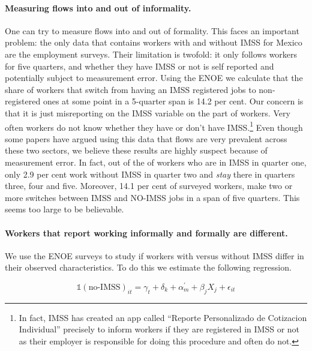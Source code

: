 \documentclass[oneside,11pt]{article}
\begin{document}
\paragraph{Measuring flows into and out of informality.} One can try to measure flows into and out of formality. This faces an important problem: the only data that contains workers with and without IMSS for Mexico are the employment surveys. Their limitation is twofold: it only follows workers for five quarters, and whether they have IMSS or not is self reported and potentially subject to measurement error. Using the ENOE we calculate that the share of workers that switch from having an IMSS registered jobs to non-registered ones at some point in a 5-quarter span is 14.2 per cent.  Our concern is that it is just misreporting on the IMSS variable on the part of workers. Very often workers do not know whether they have or don't have IMSS.\footnote{In fact, IMSS has created an app called ``Reporte Personalizado de Cotizacion Individual'' precisely to inform workers if they are registered in IMSS or not as their employer is responsible for doing this procedure and often do not.} Even though some papers have argued using this data that flows are very prevalent across these two sectors, we believe these results are highly suspect because of measurement error. In fact, out of the of workers who are in IMSS in quarter one, only 2.9 per cent work without IMSS in quarter two and \textit{stay} there in quarters three, four and five. Moreover, 14.1 per cent of surveyed workers, make two or more switches between IMSS and NO-IMSS jobs in a span of five quarters. This seems too large to be believable.

\paragraph{Workers that report working informally and formally are different.}

We use the ENOE surveys to study if workers with versus without IMSS differ in their observed characteristics. To do this we estimate the following regression.

\begin{equation} \label{determinants_eqn}
    \mathds{1}(\text{no-IMSS})_{it} = \gamma_t + \delta_k + \alpha^\prime_m + \beta_j X_j + \epsilon_{it} 
\end{equation}
\end{document}
